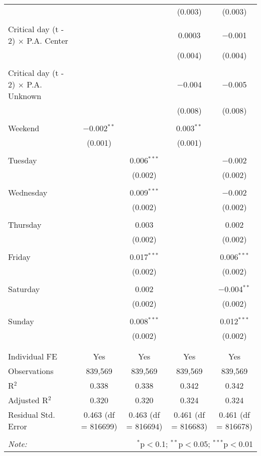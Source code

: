 \documentclass[
]{article}
\begin{document}
\begin{table}[!htbp]
{\begin{tabular}{@{\extracolsep{5pt}}lcccc}
  &  &  & (0.003) & (0.003) \\ 
  & & & & \\ 
 Critical day (t - 2) $\times$ P.A. Center &  &  & 0.0003 & $-$0.001 \\ 
  &  &  & (0.004) & (0.004) \\ 
  & & & & \\ 
 Critical day (t - 2) $\times$ P.A. Unknown &  &  & $-$0.004 & $-$0.005 \\ 
  &  &  & (0.008) & (0.008) \\ 
  & & & & \\ 
 Weekend & $-$0.002$^{**}$ &  & 0.003$^{**}$ &  \\ 
  & (0.001) &  & (0.001) &  \\ 
  & & & & \\ 
 Tuesday &  & 0.006$^{***}$ &  & $-$0.002 \\ 
  &  & (0.002) &  & (0.002) \\ 
  & & & & \\ 
 Wednesday &  & 0.009$^{***}$ &  & $-$0.002 \\ 
  &  & (0.002) &  & (0.002) \\ 
  & & & & \\ 
 Thursday &  & 0.003 &  & 0.002 \\ 
  &  & (0.002) &  & (0.002) \\ 
  & & & & \\ 
 Friday &  & 0.017$^{***}$ &  & 0.006$^{***}$ \\ 
  &  & (0.002) &  & (0.002) \\ 
  & & & & \\ 
 Saturday &  & 0.002 &  & $-$0.004$^{**}$ \\ 
  &  & (0.002) &  & (0.002) \\ 
  & & & & \\ 
 Sunday &  & 0.008$^{***}$ &  & 0.012$^{***}$ \\ 
  &  & (0.002) &  & (0.002) \\ 
  & & & & \\ 
\hline \\[-1.8ex] 
Individual FE & Yes & Yes & Yes & Yes \\ 
Observations & 839,569 & 839,569 & 839,569 & 839,569 \\ 
R$^{2}$ & 0.338 & 0.338 & 0.342 & 0.342 \\ 
Adjusted R$^{2}$ & 0.320 & 0.320 & 0.324 & 0.324 \\ 
Residual Std. Error & 0.463 (df = 816699) & 0.463 (df = 816694) & 0.461 (df = 816683) & 0.461 (df = 816678) \\ 
\hline 
\hline \\[-1.8ex] 
\textit{Note:}  & \multicolumn{4}{r}{$^{*}$p$<$0.1; $^{**}$p$<$0.05; $^{***}$p$<$0.01} \\ 
\end{tabular}
} 
\end{table} 
\newpage
\end{document}
